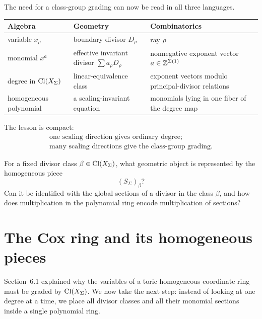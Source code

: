 \begin{threedictionaries}
The need for a class-group grading can now be read in all three
languages.

\medskip

\begin{center}
\small
\begin{tabularx}{\linewidth}{@{}
  >{\raggedright\arraybackslash}X
  >{\raggedright\arraybackslash}X
  >{\raggedright\arraybackslash}X@{}}
\toprule
\textbf{Algebra}
&
\textbf{Geometry}
&
\textbf{Combinatorics}
\\
\midrule
variable \(x_\rho\)
&
boundary divisor \(D_\rho\)
&
ray \(\rho\)
\\
monomial \(x^a\)
&
effective invariant divisor \(\sum a_\rho D_\rho\)
&
nonnegative exponent vector \(a\in\mathbb{Z}^{\Sigma(1)}\)
\\
degree in \(\operatorname{Cl}(X_\Sigma)\)
&
linear-equivalence class
&
exponent vectors modulo principal-divisor relations
\\
homogeneous polynomial
&
a scaling-invariant equation
&
monomials lying in one fiber of the degree map
\\
\bottomrule
\end{tabularx}
\end{center}
\end{threedictionaries}

The lesson is compact:
\[
\boxed{
\begin{gathered}
\text{one scaling direction gives ordinary degree;}\\
\text{many scaling directions give the class-group grading.}
\end{gathered}
}
\]

\begin{guidingquestion}
For a fixed divisor class \(\beta\in\operatorname{Cl}(X_\Sigma)\), what geometric
object is represented by the homogeneous piece
\[
(S_\Sigma)_\beta?
\]
Can it be identified with the global sections of a divisor in the
class \(\beta\), and how does multiplication in the polynomial ring
encode multiplication of sections?
\end{guidingquestion}
\section{The Cox ring and its homogeneous pieces}
\label{sec:cox-ring-homogeneous-pieces}

Section~6.1 explained why the variables of a toric homogeneous
coordinate ring must be graded by \(\operatorname{Cl}(X_\Sigma)\). We now take the
next step: instead of looking at one degree at a time, we place all
divisor classes and all their monomial sections inside a single
polynomial ring.

